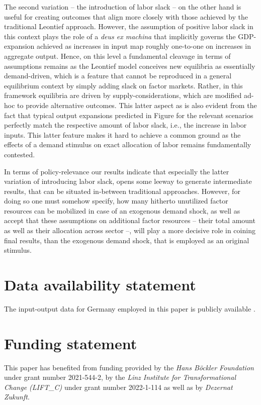 \documentclass{article}
\begin{document}
The second variation -- the introduction of labor slack -- on the other hand is useful for creating outcomes that align more closely with those achieved by the traditional Leontief approach. However, the assumption of positive labor slack in this context plays the role of a \textit{deus ex machina} that implicitly governs the GDP-expansion achieved as increases in input map roughly one-to-one on increases in aggregate output. Hence, on this level a fundamental cleavage in terms of assumptions remains as the Leontief model conceives new equilibria as essentially demand-driven, which is a feature that cannot be reproduced in a general equilibrium context by simply adding slack on factor markets. Rather, in this framework equilibria are driven by supply-considerations, which are modified ad-hoc to provide alternative outcomes. This latter aspect as is also evident from the fact that typical output expansions predicted in Figure \label{fig:labour_camp} for the relevant scenarios perfectly match the respective amount of labor slack, i.e., the increase in labor inputs. This latter feature makes it hard to achieve a common ground as the effects of a demand stimulus on exact allocation of labor remains fundamentally contested.

In terms of policy-relevance our results indicate that especially the latter variation of introducing labor slack, opens some leeway to generate intermediate results, that can be situated in-between traditional approaches. However, for doing so one must somehow specify, how many hitherto unutilized factor resources can be mobilized in case of an exogenous demand shock, as well as accept that these assumptions on additional factor resources -- their total amount as well as their allocation across sector --, will play a more decisive role in coining final results, than the exogenous demand shock, that is employed as an original stimulus.

\section*{Data availability statement}
The input-output data for Germany employed in this paper is publicly available \citep[see][]{IOTabelle}.

\section*{Funding statement}

This paper has benefited from funding provided by the \textit{Hans Böckler Foundation} under grant number 2021-544-2, by the \textit{Linz Institute for Transformational Change (LIFT\_C)} under grant number 2022-1-114 as well as by \textit{Dezernat Zukunft}.
\end{document}
